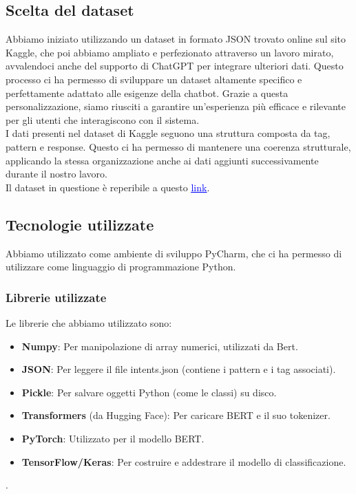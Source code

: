 \documentclass[12pt, letterpaper]{article}
\begin{document}
\subsection{Scelta del dataset}
Abbiamo iniziato utilizzando un dataset in formato JSON trovato online sul sito Kaggle, che poi abbiamo ampliato e perfezionato attraverso un lavoro mirato, avvalendoci anche del supporto di ChatGPT per integrare ulteriori dati. Questo processo ci ha permesso di sviluppare un dataset altamente specifico e perfettamente adattato alle esigenze della chatbot. Grazie a questa personalizzazione, siamo riusciti a garantire un’esperienza più efficace e rilevante per gli utenti che interagiscono con il sistema.\\
I dati presenti nel dataset di Kaggle seguono una struttura composta da tag, pattern e response. Questo ci ha permesso di mantenere una coerenza strutturale, applicando la stessa organizzazione anche ai dati aggiunti successivamente durante il nostro lavoro.\\
Il dataset in questione è reperibile a questo \href{https://www.kaggle.com/code/jocelyndumlao/chatbot-for-mental-health-conversations}{\textcolor{blue}{\underline{link}}}.

\subsection{Tecnologie utilizzate}
Abbiamo utilizzato come ambiente di sviluppo PyCharm, che ci ha permesso di utilizzare come linguaggio di programmazione Python. 

\subsubsection{Librerie utilizzate}
Le librerie che abbiamo utilizzato sono:
\begin{itemize}
	\item \textbf{Numpy}: Per manipolazione di array numerici, utilizzati da Bert.
	
	\item \textbf{JSON}: Per leggere il file intents.json (contiene i pattern e i tag associati).
	
	\item \textbf{Pickle}: Per salvare oggetti Python (come le classi) su disco.
	
	\item \textbf{Transformers} (da Hugging Face): Per caricare BERT e il suo tokenizer.
	
	\item \textbf{PyTorch}: Utilizzato per il modello BERT.
	
	\item \textbf{TensorFlow/Keras}: Per costruire e addestrare il modello di classificazione.
	
\end{itemize}.
\end{document}
